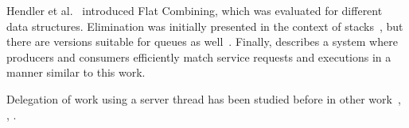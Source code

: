Hendler et al.~\cite{Hendler2010} introduced Flat Combining, which was evaluated for different data structures. Elimination was initially presented in the context of stacks~\cite{Hendler2010a}, but there are versions suitable for queues as well~\cite{Moir2005}.
Finally, \cite{Afek2011} describes a system where producers and consumers efficiently match service requests and executions in a manner similar to this work.

Delegation of work using a server thread has been studied before in other work~\cite{Metreveli2012}, \cite{DBLP:conf/opodis/CalciuDHHKMM13}, \cite{HotPar13Stack}.
